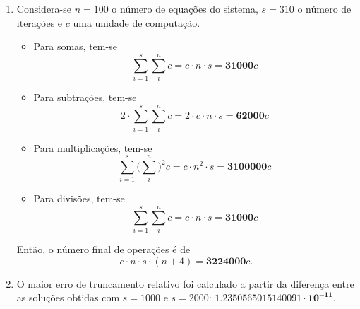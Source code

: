 \documentclass{article}
\newenvironment{arabenum}{
    \begin{enumerate}[label=\textbf{\arabic*})]
}{
    \end{enumerate}
}
\newenvironment{alphenum}{
    \begin{enumerate}[label=(\alph*)]
}{
    \end{enumerate}
}
\begin{document}
\begin{arabenum}
\begin{alphenum}
\item Considera-se $n = 100$ o número de equações do sistema, $s = 310$ o
número de iterações e $c$ uma unidade de computação.

\begin{itemize}

\item Para somas, tem-se
\begin{equation*}
\sum_{i=1}^s \sum_{i}^n c = c \cdot n \cdot s = \boldsymbol{31000}c
\end{equation*}

\item Para subtrações, tem-se
\begin{equation*}
2 \cdot \sum_{i=1}^s \sum_{i}^n c = 2 \cdot c \cdot n \cdot s
= \boldsymbol{62000}c
\end{equation*}

\item Para multiplicações, tem-se
\begin{equation*}
\sum_{i=1}^s \Big(\sum_{i}^n\Big)^2 c = c \cdot n^2 \cdot s
= \boldsymbol{3100000}c
\end{equation*}

\item Para divisões, tem-se
\begin{equation*}
\sum_{i=1}^s \sum_{i}^n c = c \cdot n \cdot s = \boldsymbol{31000}c
\end{equation*}

\end{itemize}

Então, o número final de operações é de
\begin{equation*}
c \cdot n \cdot s \cdot (n + 4) = \boldsymbol{3224000}c.
\end{equation*}

\item O maior erro de truncamento relativo foi calculado a partir da diferença
entre as soluções obtidas com $s = 1000$ e $s = 2000$:
$\boldsymbol{1.2350565015140091 \cdot 10^{-11}}$.

\end{alphenum}

\end{arabenum}
\end{document}
